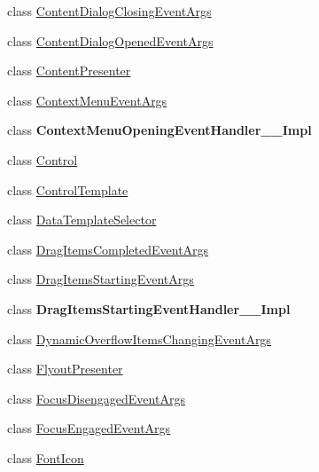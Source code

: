 \begin{DoxyCompactItemize}
\item 
class \hyperlink{class_windows_1_1_u_i_1_1_xaml_1_1_controls_1_1_content_dialog_closing_event_args}{Content\+Dialog\+Closing\+Event\+Args}
\item 
class \hyperlink{class_windows_1_1_u_i_1_1_xaml_1_1_controls_1_1_content_dialog_opened_event_args}{Content\+Dialog\+Opened\+Event\+Args}
\item 
class \hyperlink{class_windows_1_1_u_i_1_1_xaml_1_1_controls_1_1_content_presenter}{Content\+Presenter}
\item 
class \hyperlink{class_windows_1_1_u_i_1_1_xaml_1_1_controls_1_1_context_menu_event_args}{Context\+Menu\+Event\+Args}
\item 
class {\bfseries Context\+Menu\+Opening\+Event\+Handler\+\_\+\+\_\+\+Impl}
\item 
class \hyperlink{class_windows_1_1_u_i_1_1_xaml_1_1_controls_1_1_control}{Control}
\item 
class \hyperlink{class_windows_1_1_u_i_1_1_xaml_1_1_controls_1_1_control_template}{Control\+Template}
\item 
class \hyperlink{class_windows_1_1_u_i_1_1_xaml_1_1_controls_1_1_data_template_selector}{Data\+Template\+Selector}
\item 
class \hyperlink{class_windows_1_1_u_i_1_1_xaml_1_1_controls_1_1_drag_items_completed_event_args}{Drag\+Items\+Completed\+Event\+Args}
\item 
class \hyperlink{class_windows_1_1_u_i_1_1_xaml_1_1_controls_1_1_drag_items_starting_event_args}{Drag\+Items\+Starting\+Event\+Args}
\item 
class {\bfseries Drag\+Items\+Starting\+Event\+Handler\+\_\+\+\_\+\+Impl}
\item 
class \hyperlink{class_windows_1_1_u_i_1_1_xaml_1_1_controls_1_1_dynamic_overflow_items_changing_event_args}{Dynamic\+Overflow\+Items\+Changing\+Event\+Args}
\item 
class \hyperlink{class_windows_1_1_u_i_1_1_xaml_1_1_controls_1_1_flyout_presenter}{Flyout\+Presenter}
\item 
class \hyperlink{class_windows_1_1_u_i_1_1_xaml_1_1_controls_1_1_focus_disengaged_event_args}{Focus\+Disengaged\+Event\+Args}
\item 
class \hyperlink{class_windows_1_1_u_i_1_1_xaml_1_1_controls_1_1_focus_engaged_event_args}{Focus\+Engaged\+Event\+Args}
\item 
class \hyperlink{class_windows_1_1_u_i_1_1_xaml_1_1_controls_1_1_font_icon}{Font\+Icon}
\item 

\end{DoxyCompactItemize}
